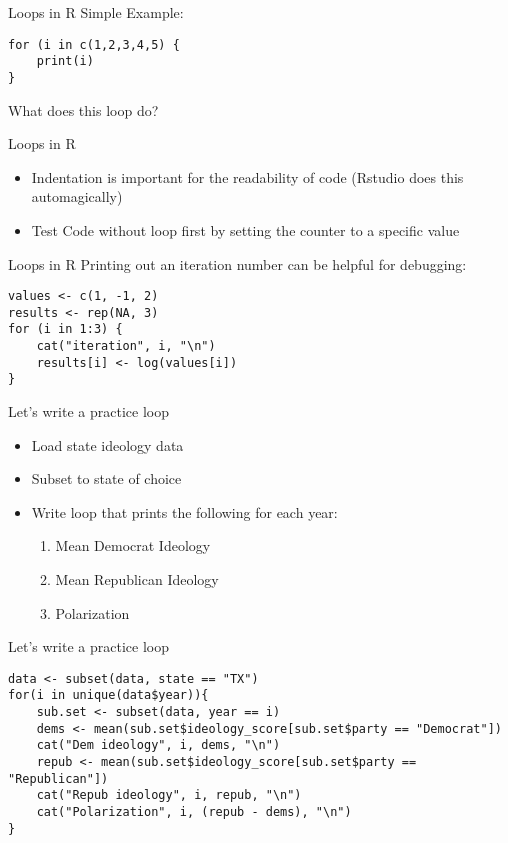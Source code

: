 \documentclass[presentation]{beamer}
\begin{document}
\begin{frame}[fragile,label={sec:org00d3201}]{Loops in R}
 Simple Example:

\begin{verbatim}
for (i in c(1,2,3,4,5) {
    print(i)
}
\end{verbatim}

What does this loop do?
\end{frame}

\begin{frame}[label={sec:orgcf3a119}]{Loops in R}
\begin{itemize}
\item Indentation is important for the readability of code (Rstudio does this automagically)
\item Test  Code without loop first by setting the counter to a specific value
\end{itemize}
\end{frame}



\begin{frame}[fragile,label={sec:org046254c}]{Loops in R}
 Printing out an iteration number can be helpful for debugging:

\begin{verbatim}
values <- c(1, -1, 2)
results <- rep(NA, 3)
for (i in 1:3) {
    cat("iteration", i, "\n")
    results[i] <- log(values[i])
}
\end{verbatim}
\end{frame}


\begin{frame}[label={sec:org18b42c1}]{Let's write a practice loop}
\begin{itemize}
\item Load state ideology data
\item Subset to state of choice
\item Write loop that prints the following for each year:
\begin{enumerate}
\item Mean Democrat Ideology
\item Mean Republican Ideology
\item Polarization
\end{enumerate}
\end{itemize}
\end{frame}

\begin{frame}[fragile,shrink=25,label={sec:orgea94df4}]{Let's write a practice loop}
 \begin{verbatim}
data <- subset(data, state == "TX")
for(i in unique(data$year)){
    sub.set <- subset(data, year == i)
    dems <- mean(sub.set$ideology_score[sub.set$party == "Democrat"])
    cat("Dem ideology", i, dems, "\n")
    repub <- mean(sub.set$ideology_score[sub.set$party == "Republican"])
    cat("Repub ideology", i, repub, "\n")
    cat("Polarization", i, (repub - dems), "\n")
}
\end{verbatim}
\end{frame}
\end{document}
